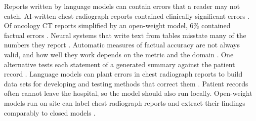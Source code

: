 \documentclass[largeformat]{interact} %
\begin{document}
Reports written by language models can contain errors that a reader may not catch. AI-written chest radiograph reports
contained clinically significant errors \citep{tanno2025}. Of oncology CT reports simplified by an open-weight model,
6\% contained factual errors \citep{prucker2025}. Neural systems that write text from tables misstate many of the
numbers they report \citep{wiseman2017}. Automatic measures of factual accuracy are not always valid, and how well they work depends on the metric and the
domain \citep{gabriel2021}. One alternative tests each statement of a generated summary against the patient record
\citep{zeba2026}. Language models can plant errors in chest radiograph reports to build data sets for developing and testing methods that correct them \citep{rao2025rexerr}. Patient records
often cannot leave the hospital, so the model should also run locally. Open-weight models run on site can label chest radiograph reports \citep{mukherjee2023} and extract their findings
comparably to closed models \citep{nowak2025}.
\end{document}
